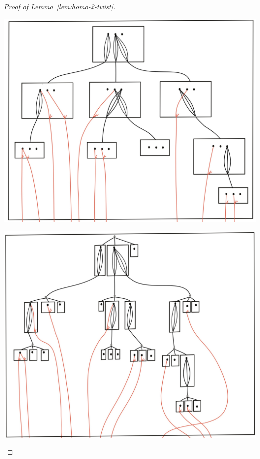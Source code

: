 \begin{proof}[Proof of Lemma~\ref{lem:homo-2-twist}]
~\\
\begin{center}
\includegraphics[scale=.07]{MyPic35.jpg}
\end{center} 
\begin{center}
\includegraphics[scale=.07]{MyPic36.jpg}
\end{center} 
\begin{center}

\end{center}
\end{proof}

